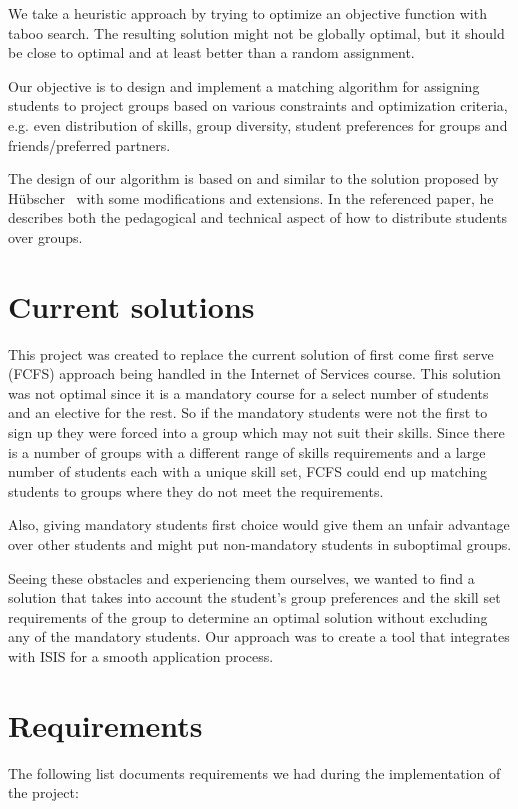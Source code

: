 We take a heuristic approach by trying to optimize an objective function with taboo search. The resulting solution might not be globally optimal, but it should be close to optimal and at least better than a random assignment.

Our objective is to design and implement a matching algorithm for assigning students to project groups based on various constraints and optimization criteria, e.g. even distribution of skills, group diversity, student preferences for groups and friends/preferred partners.

The design of our algorithm is based on and similar to the solution proposed by H{\"u}bscher~\cite{hubscher2010assigning} with some modifications and extensions. In the referenced paper, he describes both the pedagogical and technical aspect of how to distribute students over groups.

\section{Current solutions}
This project was created to replace the current solution of first come first serve (FCFS) approach being handled in the Internet of Services course. This solution was not optimal since it is a mandatory course for a select number of students and an elective for the rest. So if the mandatory students were not the first to sign up they were forced into a group which may not suit their skills. Since there is a number of groups with a different range of skills requirements and a large number of students each with a unique skill set, FCFS could end up matching students to groups where they do not meet the requirements.

Also, giving mandatory students first choice would give them an unfair advantage over other students and might put non-mandatory students in suboptimal groups.

Seeing these obstacles and experiencing them ourselves, we wanted to find a solution that takes into account the student's group preferences and the skill set requirements of the group to determine an optimal solution without excluding any of the mandatory students. Our approach was to create a tool that integrates with ISIS for a smooth application process.

\section{Requirements}
The following list documents requirements we had during the implementation of the project:

